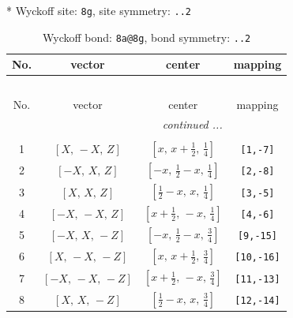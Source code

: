\documentclass[fleqn,8pt]{jsarticle}
\begin{document}
* Wyckoff site: {\tt 8g}, site symmetry: {\tt ..2}
\renewcommand{\arraystretch}{1.2}
\begin{longtable}{cccc}
\caption{Wyckoff bond: {\tt 8a@8g}, bond symmetry: {\tt ..2}}
 \\
 \hline \hline
No. & vector & center & mapping \\ \hline \endfirsthead

\multicolumn{3}{l}{\tablename\ \thetable{}} \\
 \hline \hline
No. & vector & center & mapping \\ \hline \endhead

 \hline \hline
\multicolumn{3}{r}{\footnotesize\it continued ...} \\ \endfoot

 \hline \hline
\multicolumn{3}{r}{} \\ \endlastfoot

1 & $\left[ X,\, - X,\, Z \right]$ & $\left[ x,\, x + \frac{1}{2},\, \frac{1}{4} \right]$ & {\tt [1,-7]} \\ \hline
2 & $\left[ - X,\, X,\, Z \right]$ & $\left[ - x,\, \frac{1}{2} - x,\, \frac{1}{4} \right]$ & {\tt [2,-8]} \\ \hline
3 & $\left[ X,\, X,\, Z \right]$ & $\left[ \frac{1}{2} - x,\, x,\, \frac{1}{4} \right]$ & {\tt [3,-5]} \\ \hline
4 & $\left[ - X,\, - X,\, Z \right]$ & $\left[ x + \frac{1}{2},\, - x,\, \frac{1}{4} \right]$ & {\tt [4,-6]} \\ \hline
5 & $\left[ - X,\, X,\, - Z \right]$ & $\left[ - x,\, \frac{1}{2} - x,\, \frac{3}{4} \right]$ & {\tt [9,-15]} \\ \hline
6 & $\left[ X,\, - X,\, - Z \right]$ & $\left[ x,\, x + \frac{1}{2},\, \frac{3}{4} \right]$ & {\tt [10,-16]} \\ \hline
7 & $\left[ - X,\, - X,\, - Z \right]$ & $\left[ x + \frac{1}{2},\, - x,\, \frac{3}{4} \right]$ & {\tt [11,-13]} \\ \hline
8 & $\left[ X,\, X,\, - Z \right]$ & $\left[ \frac{1}{2} - x,\, x,\, \frac{3}{4} \right]$ & {\tt [12,-14]} \\
\end{longtable}
\renewcommand{\arraystretch}{1.2}
\end{document}
